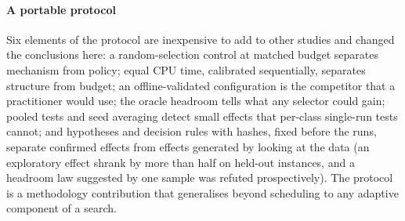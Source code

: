 \paragraph{A portable protocol}
Six elements of the protocol are inexpensive to add to other studies and changed the conclusions here: a random-selection control at matched budget separates mechanism from policy; equal CPU time, calibrated sequentially, separates
structure from budget; an offline-validated configuration is the competitor that a practitioner would use; the oracle headroom tells what any selector could gain; pooled tests and seed averaging detect small effects that per-class
single-run tests cannot; and hypotheses and decision rules with hashes, fixed before the runs, separate confirmed effects from effects generated by looking at the data (an exploratory effect shrank by more than half on held-out
instances, and a headroom law suggested by one sample was refuted prospectively). The protocol is a methodology contribution that generalises beyond scheduling to any adaptive component of a search.

